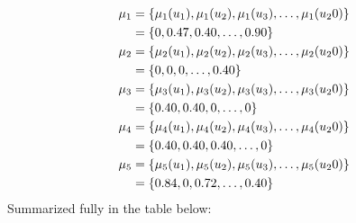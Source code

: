 \documentclass[a4paper,openany]{book}
\begin{document}
				\begin{align}
					\mu_1 &= \{ \mu_1(u_1), \mu_1(u_2), \mu_1(u_3),\dots,\mu_1(u_20) \} \\
					&= \{ 0, 0.47, 0.40,\dots,0.90 \} \notag \\
					\mu_2 &= \{ \mu_2(u_1), \mu_2(u_2), \mu_2(u_3),\dots,\mu_2(u_20) \}\\
					&= \{ 0, 0, 0,\dots,0.40 \} \notag \\
					\mu_3 &= \{ \mu_3(u_1), \mu_3(u_2), \mu_3(u_3),\dots,\mu_3(u_20) \}\\
					&= \{ 0.40, 0.40, 0,\dots,0 \} \notag \\
					\mu_4 &= \{ \mu_4(u_1), \mu_4(u_2), \mu_4(u_3),\dots,\mu_4(u_20) \}\\
					&= \{ 0.40, 0.40, 0.40,\dots,0 \} \notag \\
					\mu_5 &= \{ \mu_5(u_1), \mu_5(u_2), \mu_5(u_3),\dots,\mu_5(u_20) \}\\
					&= \{ 0.84, 0, 0.72,\dots,0.40 \} \notag					
				\end{align}
				Summarized fully in the table below:
				
\end{document}
